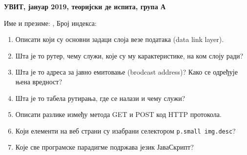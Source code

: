 \documentclass[a4paper]{article}
\begin{document}
\begin{center}
\textbf{УВИТ, јануар 2019, теоријски де испита, група А}  
\end{center}

Име и презиме: \hrulefill, Број индекса: \hrulefill

\begin{enumerate}

\item Описати који су основни задаци слоја везе података (data link layer). \hrulefill

\hrulefill

\hrulefill

\hrulefill

\hrulefill

\item Шта је то рутер, чему служи, које су му карактеристике, на ком слоју ради? \hrulefill

\hrulefill

\hrulefill

\hrulefill

\hrulefill

\item Шта је то адреса за јавно емитовање (brodcast address)? Како се одређује њена вредност?\hrulefill

\hrulefill

\hrulefill

\hrulefill

\hrulefill

\item Шта је то табела рутирања, где се налази и чему служи?\hrulefill


\hrulefill

\hrulefill

\hrulefill

\hrulefill

\item Описати разлике између метода GET и POST код HTTP протокола.\hrulefill

\hrulefill

\hrulefill

\hrulefill

\hrulefill

\item Који елементи на веб страни су изабрани селектором \verb|p.small img.desc|? \hrulefill

\hrulefill

\hrulefill


\item Које све програмске парадигме подржава језик ЈаваСкрипт?\hrulefill


\end{enumerate}
\end{document}
